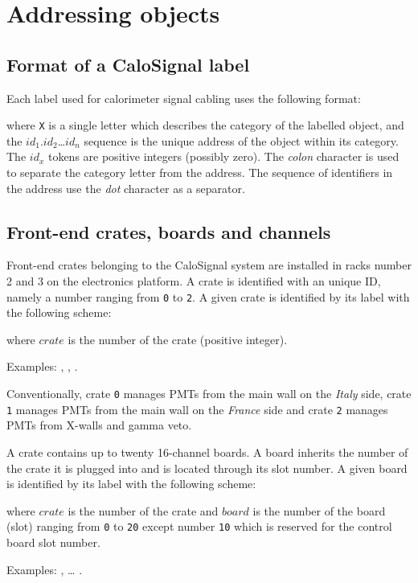 \section{Addressing objects}

\subsection{Format of a CaloSignal label}

Each label used for calorimeter signal cabling uses  the following
format:

\begin{center}
\end{center}
\noindent  where \texttt{X}  is a  single letter  which describes  the
category  of the  labelled  object,  and the  $id_1$.$id_2$\dots$id_n$
sequence is the unique address of the object within its category.  The
$id_x$ tokens are positive integers (possibly zero).  The \emph{colon}
character is  used to separate  the category letter from  the address.
The  sequence  of  identifiers  in  the  address  use  the  \emph{dot}
character as a separator.


\subsection{Front-end crates, boards and channels}

Front-end crates belonging  to the CaloSignal system  are installed in
racks  number  2 and  3  on  the  electronics  platform.  A  crate  is
identified with an unique ID,  namely a number ranging from \texttt{0}
to \texttt{2}.   A given  crate is  identified by  its label  with the
following scheme:
\begin{center}
 \end{center}
where \texttt{$crate$} is the number of the crate (positive integer).
\vskip     10pt    \par\noindent     Examples:    ,
,
.   \par Conventionally,  crate \texttt{0}  manages
PMTs from  the main  wall on the  \emph{Italy} side,  crate \texttt{1}
manages PMTs  from the main wall  on the \emph{France} side  and crate
\texttt{2} manages PMTs from X-walls and gamma veto.

 \vskip 10pt A crate contains up to twenty 16-channel boards.  A board
 inherits the  number of the crate  it is plugged into  and is located
 through its  slot number. A  given board  is identified by  its label
 with the following scheme:
\begin{center}
 \end{center}
where \texttt{$crate$} is the number of the crate and \texttt{$board$}
is  the  number  of  the  board  (slot)  ranging  from  \texttt{0}  to
\texttt{20}  except  number  \texttt{10}  which is  reserved  for  the
control board slot number.
\vskip 10pt
\par\noindent Examples: ,  \dots
{}.

